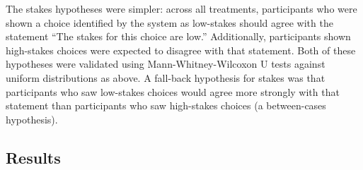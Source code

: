 The stakes hypotheses were simpler: across all treatments, participants who were shown a choice identified by the system as low-stakes should agree with the statement ``The stakes for this choice are low.''
%
Additionally, participants shown high-stakes choices were expected to disagree with that statement.
%
Both of these hypotheses were validated using Mann-Whitney-Wilcoxon U tests against uniform distributions as above.
%
A fall-back hypothesis for stakes was that participants who saw low-stakes choices would agree more strongly with that statement than participants who saw high-stakes choices (a between-cases hypothesis).


\subsection{Results}

\label{sec:e1-results}

